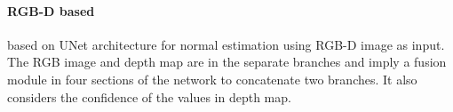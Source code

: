 \paragraph{RGB-D based}
\cite{hfm} based on UNet architecture for normal estimation using RGB-D image as input. The RGB image and depth map are in the separate branches and imply a fusion module in four sections of the network to concatenate two branches. It also considers the confidence of the values in depth map.












